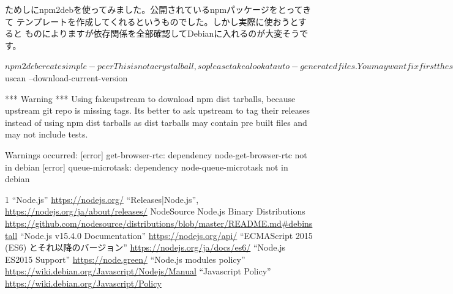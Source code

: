 \documentclass[mingoth,a4paper]{jsarticle}
\begin{document}
ためしにnpm2debを使ってみました。公開されているnpmパッケージをとってきて
テンプレートを作成してくれるというものでした。しかし実際に使おうとすると
ものによりますが依存関係を全部確認してDebianに入れるのが大変そうです。

\begin{commandline}
$ npm2deb create simple-peer

This is not a crystal ball, so please take a look at auto-generated files.

You may want fix first these issues:

simple-peer/node-simple-peer/debian/changelog: -- FIX_ME debian author  Sat, 16 Jan 2021 10:39:59 +0900
simple-peer/node-simple-peer/debian/control:Uploaders: FIX_ME debian author
simple-peer/node-simple-peer/debian/control:Description: FIX_ME write the Debian package description
simple-peer/node-simple-peer/debian/copyright:Copyright: 2021, FIX_ME debian author
simple-peer/node-simple-peer_itp.mail:Subject: ITP: node-simple-peer -- FIX_ME write the Debian package description
simple-peer/node-simple-peer_itp.mail:Owner: FIX_ME debian author
simple-peer/node-simple-peer_itp.mail:  Description     : FIX_ME write the Debian package description
simple-peer/node-simple-peer_itp.mail: FIX_ME: This ITP report is not ready for submission, until you are
simple-peer/node-simple-peer_itp.mail:FIX_ME: Explain why this package is suitable for adding to Debian. Is
simple-peer/node-simple-peer_itp.mail:FIX_ME: Explain how you intend to consistently maintain this package

Use uscan to get orig source files. Fix debian/watch and then run                    
$ uscan --download-current-version


*** Warning ***
Using fakeupstream to download npm dist tarballs, because upstream
git repo is missing tags. Its better to ask upstream to tag their releases
instead of using npm dist tarballs as dist tarballs may contain pre built files
and may not include tests.

Warnings occurred:
 [error]   get-browser-rtc: dependency node-get-browser-rtc not in debian
 [error]   queue-microtask: dependency node-queue-microtask not in debian

\end{commandline}

\begin{thebibliography}{1}
  ``Node.js'' \url{https://nodejs.org/}
  ``Releases|Node.js'', \url{https://nodejs.org/ja/about/releases/}
  NodeSource Node.js Binary Distributions
	 \url{https://github.com/nodesource/distributions/blob/master/README.md#debinstall}
  ``Node.js v15.4.0 Documentation''  \url{https://nodejs.org/api/}
  ``ECMAScript 2015 (ES6) とそれ以降のバージョン''
	 \url{https://nodejs.org/ja/docs/es6/}
  ``Node.js ES2015 Support'' \url{https://node.green/}
	 ``Node.js modules policy'' 
	 \url{https://wiki.debian.org/Javascript/Nodejs/Manual}
	 ``Javascript Policy''
	 \url{https://wiki.debian.org/Javascript/Policy}

\end{thebibliography}
\end{document}
